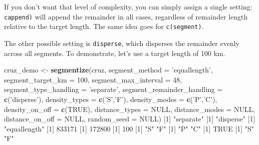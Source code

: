 \documentclass[
]{book}
\newenvironment{Shaded}{\begin{snugshade}}{\end{snugshade}}
\newcommand{\DataTypeTok}[1]{\textcolor[rgb]{0.13,0.29,0.53}{#1}}
\newcommand{\DecValTok}[1]{\textcolor[rgb]{0.00,0.00,0.81}{#1}}
\newcommand{\KeywordTok}[1]{\textcolor[rgb]{0.13,0.29,0.53}{\textbf{#1}}}
\newcommand{\NormalTok}[1]{#1}
\newcommand{\OtherTok}[1]{\textcolor[rgb]{0.56,0.35,0.01}{#1}}
\newcommand{\StringTok}[1]{\textcolor[rgb]{0.31,0.60,0.02}{#1}}
\begin{document}
If you don't want that level of complexity, you can simply assign a single setting: \texttt{c\textquotesingle{}append\textquotesingle{})} will append the remainder in all cases, regardless of remainder length relative to the target length. The same idea goes for \texttt{c(\textquotesingle{}segment\textquotesingle{})}.

The other possible setting is \texttt{disperse}, which disperses the remainder evenly across all segments. To demonstrate, let's use a target length of 100 km.

\begin{Shaded}
\begin{Highlighting}[]
\NormalTok{cruz_demo <-}\StringTok{ }\KeywordTok{segmentize}\NormalTok{(cruz,}
                        \DataTypeTok{segment_method =} \StringTok{'equallength'}\NormalTok{,}
                        \DataTypeTok{segment_target_km =} \DecValTok{100}\NormalTok{,}
                        \DataTypeTok{segment_max_interval =} \DecValTok{48}\NormalTok{,}
                        \DataTypeTok{segment_type_handling =} \StringTok{'separate'}\NormalTok{,}
                        \DataTypeTok{segment_remainder_handling =} \KeywordTok{c}\NormalTok{(}\StringTok{'disperse'}\NormalTok{),}
                        \DataTypeTok{density_types =} \KeywordTok{c}\NormalTok{(}\StringTok{'S'}\NormalTok{,}\StringTok{'F'}\NormalTok{),}
                        \DataTypeTok{density_modes =} \KeywordTok{c}\NormalTok{(}\StringTok{'P'}\NormalTok{,}\StringTok{'C'}\NormalTok{),}
                        \DataTypeTok{density_on_off =} \KeywordTok{c}\NormalTok{(}\OtherTok{TRUE}\NormalTok{),}
                        \DataTypeTok{distance_types =} \OtherTok{NULL}\NormalTok{,}
                        \DataTypeTok{distance_modes =} \OtherTok{NULL}\NormalTok{,}
                        \DataTypeTok{distance_on_off =} \OtherTok{NULL}\NormalTok{,}
                        \DataTypeTok{random_seed =} \OtherTok{NULL}\NormalTok{)}
\NormalTok{[}\DecValTok{1}\NormalTok{] }\StringTok{"separate"}
\NormalTok{[}\DecValTok{1}\NormalTok{] }\StringTok{"disperse"}
\NormalTok{[}\DecValTok{1}\NormalTok{] }\StringTok{"equallength"}
\NormalTok{[}\DecValTok{1}\NormalTok{] }\DecValTok{833171}
\NormalTok{[}\DecValTok{1}\NormalTok{] }\DecValTok{172800}
\NormalTok{[}\DecValTok{1}\NormalTok{] }\DecValTok{100}
\NormalTok{[}\DecValTok{1}\NormalTok{] }\StringTok{"S"} \StringTok{"F"}
\NormalTok{[}\DecValTok{1}\NormalTok{] }\StringTok{"P"} \StringTok{"C"}
\NormalTok{[}\DecValTok{1}\NormalTok{] }\OtherTok{TRUE}
\NormalTok{[}\DecValTok{1}\NormalTok{] }\StringTok{"S"} \StringTok{"F"}

\end{Highlighting}
\end{Shaded}
\end{document}
